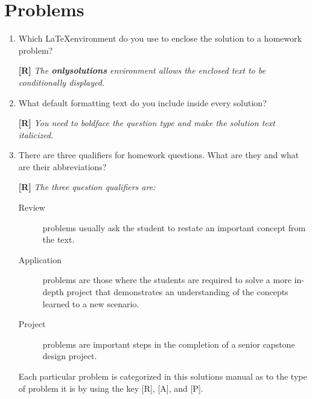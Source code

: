 \section{Problems}
\label{section:problems}

\begin{enumerate}
\def\labelenumi{\arabic{enumi}.}

\item
Which \LaTeX environment do you use to enclose the solution to a homework problem?
 \begin{onlysolution}
 \textbf{[R]}
 \itshape
 The \textbf{onlysolutions} environment allows the enclosed text to be conditionally displayed. 
\end{onlysolution}


\item
What default formatting text do you include inside every solution?
 \begin{onlysolution}
 \textbf{[R]}
 \itshape
You need to boldface the question type and make the solution text italicized.
\end{onlysolution} 


\item
There are three qualifiers for homework questions.  What are they and what are their abbreviations?

\begin{onlysolution}
\textbf{[R]}
\itshape
The three question qualifiers are:

\begin{description}
\item [Review] problems usually ask the student to restate
an important concept from the text.
\item [Application] problems are those where the students
are required to solve a more in-depth project that demonstrates an understanding of the concepts learned to a new scenario.
\item [Project] problems are important steps in the completion of a senior
capstone design project.
\end{description}

Each particular problem is categorized in this solutions manual as to the
type of problem it is by using the key [R], [A], and [P].
\end{onlysolution}




\end{enumerate}